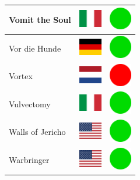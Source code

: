 \documentclass[12pt, a4paper, twoside]{report}
\begin{document}
\begin{center}
\begin{longtable}{|p{5cm}|p{2cm}|p{2cm}|}
 Vomit the Soul                                             & \includegraphics[width=1cm]{../4x3/it} &   \includegraphics[width=1cm]{../likes/y} \\ \hline
 Vor die Hunde                                              & \includegraphics[width=1cm]{../4x3/de} &   \includegraphics[width=1cm]{../likes/y} \\ \hline
 Vortex                                                     & \includegraphics[width=1cm]{../4x3/nl} &   \includegraphics[width=1cm]{../likes/n} \\ \hline
 Vulvectomy                                                 & \includegraphics[width=1cm]{../4x3/it} &   \includegraphics[width=1cm]{../likes/y} \\ \hline
 Walls of Jericho                                           & \includegraphics[width=1cm]{../4x3/us} &   \includegraphics[width=1cm]{../likes/y} \\ \hline
 Warbringer                                                 & \includegraphics[width=1cm]{../4x3/us} &   \includegraphics[width=1cm]{../likes/y} \\ \hline

\end{longtable}
\end{center}
\end{document}
